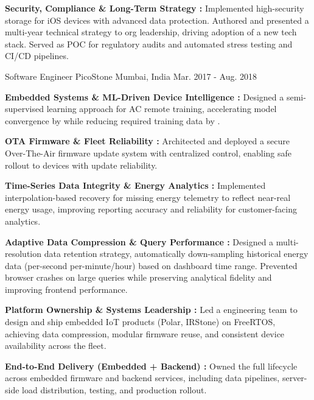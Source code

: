 \begin{cventries}
{\begin{cvitems}
			\item{\textbf{Security, Compliance \& Long-Term Strategy :}  Implemented high-security storage for iOS devices with advanced data protection. Authored and presented a multi-year technical strategy to org leadership, driving adoption of a new tech stack. Served as POC for regulatory audits and automated stress testing and CI/CD pipelines.}
		\end{cvitems}
    }



	\cventry
	{Software Engineer} %
	{PicoStone} %
	{Mumbai, India} %
	{Mar. 2017 - Aug. 2018} %
	{ \begin{cvitems} %
	\item {\textbf{Embedded Systems \& ML-Driven Device Intelligence :} Designed a semi-supervised learning approach for AC remote training, accelerating model convergence by  while reducing required training data by .} %
      \item {\textbf{OTA Firmware \& Fleet Reliability :} Architected and deployed a secure Over-The-Air  firmware update system with centralized control, enabling safe rollout to  devices with  update reliability.}
      \item{\textbf{Time-Series Data Integrity \& Energy Analytics :} Implemented interpolation-based recovery for missing energy telemetry to reflect near-real energy usage, improving reporting accuracy and reliability for customer-facing analytics.}
	  \item {\textbf{Adaptive Data Compression \& Query Performance :} Designed a multi-resolution data retention strategy, automatically down-sampling historical energy data (per-second \to per-minute/hour) based on dashboard time range. Prevented browser crashes on large queries while preserving analytical fidelity and improving frontend performance.}  %
      \item {\textbf{Platform Ownership \& Systems Leadership :} Led a  engineering team to design and ship embedded IoT products (Polar, IRStone) on FreeRTOS, achieving  data compression, modular firmware reuse, and consistent  device availability across the fleet.}  %
      \item {\textbf{End-to-End Delivery (Embedded + Backend) :} Owned the full lifecycle across embedded firmware and backend services, including data pipelines, server-side load distribution, testing, and production rollout.}
	\end{cvitems}
  }


\end{cventries}

